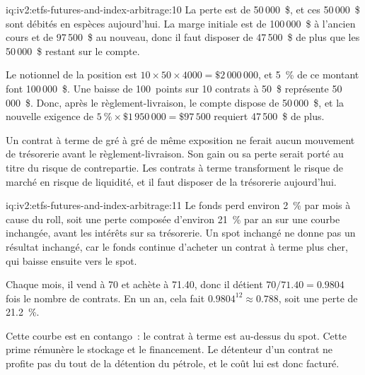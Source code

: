 \begin{solution}{iq:iv2:etfs-futures-and-index-arbitrage:10}
La perte est de 50\,000~\$, et ces 50\,000~\$ sont débités en espèces aujourd'hui. La marge initiale est de 100\,000~\$ à l'ancien cours et de 97\,500~\$ au nouveau, donc il faut disposer de 47\,500~\$ de plus que les 50\,000~\$ restant sur le compte.

Le notionnel de la position est $10 \times 50 \times 4000 = \$2\,000\,000$, et 5~\% de ce montant font 100\,000~\$. Une baisse de 100~points sur 10 contrats à 50~\$ représente 50\,000~\$. Donc, après le règlement-livraison, le compte dispose de 50\,000~\$, et la nouvelle exigence de $5~\% \times \$1\,950\,000 = \$97\,500$ requiert 47\,500~\$ de plus.

Un contrat à terme de gré à gré de même exposition ne ferait aucun mouvement de trésorerie avant le règlement-livraison. Son gain ou sa perte serait porté au titre du risque de contrepartie. Les contrats à terme transforment le risque de marché en risque de liquidité, et il faut disposer de la trésorerie aujourd'hui.

\end{solution}

\begin{solution}{iq:iv2:etfs-futures-and-index-arbitrage:11}
Le fonds perd environ 2~\% par mois à cause du roll, soit une perte composée d'environ 21~\% par an sur une courbe inchangée, avant les intérêts sur sa trésorerie. Un spot inchangé ne donne pas un résultat inchangé, car le fonds continue d'acheter un contrat à terme plus cher, qui baisse ensuite vers le spot.

Chaque mois, il vend à 70 et achète à 71.40, donc il détient $70/71.40 = 0.9804$ fois le nombre de contrats. En un an, cela fait $0.9804^{12} \approx 0.788$, soit une perte de 21.2~\%.

Cette courbe est en contango~: le contrat à terme est au-dessus du spot. Cette prime rémunère le stockage et le financement. Le détenteur d'un contrat ne profite pas du tout de la détention du pétrole, et le coût lui est donc facturé.

\end{solution}

